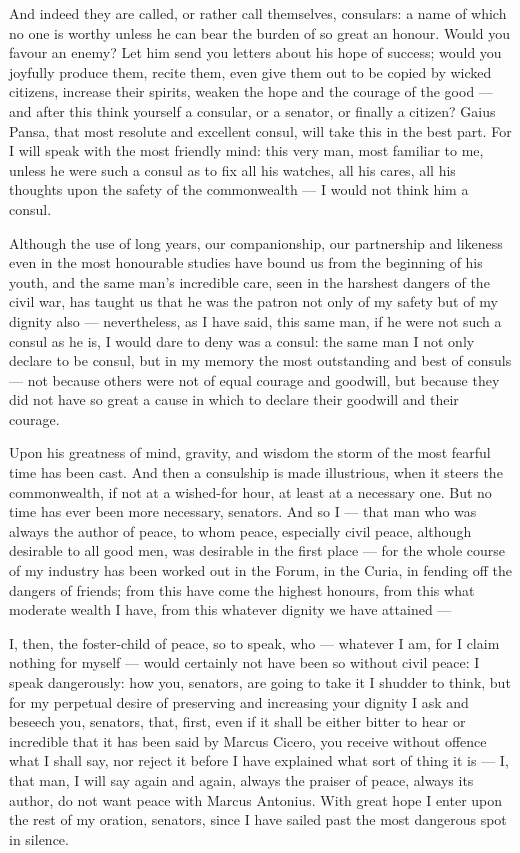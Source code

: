  And indeed they are called, or rather call themselves, consulars: a name of which no one is worthy unless he can bear the burden of so great an honour. Would you favour an enemy? Let him send you letters about his hope of success; would you joyfully produce them, recite them, even give them out to be copied by wicked citizens, increase their spirits, weaken the hope and the courage of the good --- and after this think yourself a consular, or a senator, or finally a citizen? Gaius Pansa, that most resolute and excellent consul, will take this in the best part. For I will speak with the most friendly mind: this very man, most familiar to me, unless he were such a consul as to fix all his watches, all his cares, all his thoughts upon the safety of the commonwealth --- I would not think him a consul.

 Although the use of long years, our companionship, our partnership and likeness even in the most honourable studies have bound us from the beginning of his youth, and the same man's incredible care, seen in the harshest dangers of the civil war, has taught us that he was the patron not only of my safety but of my dignity also --- nevertheless, as I have said, this same man, if he were not such a consul as he is, I would dare to deny was a consul: the same man I not only declare to be consul, but in my memory the most outstanding and best of consuls --- not because others were not of equal courage and goodwill, but because they did not have so great a cause in which to declare their goodwill and their courage.

 Upon his greatness of mind, gravity, and wisdom the storm of the most fearful time has been cast. And then a consulship is made illustrious, when it steers the commonwealth, if not at a wished-for hour, at least at a necessary one. But no time has ever been more necessary, senators. And so I --- that man who was always the author of peace, to whom peace, especially civil peace, although desirable to all good men, was desirable in the first place --- for the whole course of my industry has been worked out in the Forum, in the Curia, in fending off the dangers of friends; from this have come the highest honours, from this what moderate wealth I have, from this whatever dignity we have attained ---

 I, then, the foster-child of peace, so to speak, who --- whatever I am, for I claim nothing for myself --- would certainly not have been so without civil peace: I speak dangerously: how you, senators, are going to take it I shudder to think, but for my perpetual desire of preserving and increasing your dignity I ask and beseech you, senators, that, first, even if it shall be either bitter to hear or incredible that it has been said by Marcus Cicero, you receive without offence what I shall say, nor reject it before I have explained what sort of thing it is --- I, that man, I will say again and again, always the praiser of peace, always its author, do not want peace with Marcus Antonius. With great hope I enter upon the rest of my oration, senators, since I have sailed past the most dangerous spot in silence.

